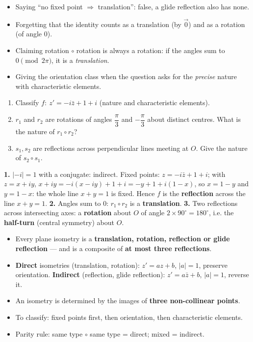 \documentclass[11pt]{article}
\begin{document}
\begin{attention}
\begin{itemize}
\item Saying ``no fixed point $\Rightarrow$ translation'': false, a glide reflection also has none.
\item Forgetting that the identity counts as a translation (by $\vec 0$) and as a rotation (of angle $0$).
\item Claiming rotation $\circ$ rotation is always a rotation: if the angles sum to $0\pmod{2\pi}$, it is a \emph{translation}.
\item Giving the orientation class when the question asks for the \emph{precise} nature with characteristic elements.
\end{itemize}
\end{attention}

\begin{exercice}[Practice]
\begin{enumerate}
\item Classify $f:\ z' = -i\bar z + 1 + i$ (nature and characteristic elements).
\item $r_1$ and $r_2$ are rotations of angles $\dfrac{\pi}{3}$ and $-\dfrac{\pi}{3}$ about distinct centres. What is the nature of $r_1\circ r_2$?
\item $s_1,s_2$ are reflections across perpendicular lines meeting at $O$. Give the nature of $s_2\circ s_1$.
\end{enumerate}
\end{exercice}

\begin{corrige}[Exercise 1]
\textbf{1.} $|{-i}|=1$ with a conjugate: indirect. Fixed points: $z=-i\bar z+1+i$; with $z=x+iy$, $x+iy = -i(x-iy)+1+i = -y+1+i(1-x)$, so $x=1-y$ and $y=1-x$: the whole line $x+y=1$ is fixed. Hence $f$ is the \textbf{reflection} across the line $x+y=1$.
\textbf{2.} Angles sum to $0$: $r_1\circ r_2$ is a \textbf{translation}.
\textbf{3.} Two reflections across intersecting axes: a \textbf{rotation} about $O$ of angle $2\times 90^\circ = 180^\circ$, i.e. the \textbf{half-turn} (central symmetry) about $O$.
\end{corrige}

\begin{aretenir}
\begin{itemize}
\item Every plane isometry is a \textbf{translation, rotation, reflection or glide reflection} — and is a composite of \textbf{at most three reflections}.
\item \textbf{Direct} isometries (translation, rotation): $z'=az+b$, $|a|=1$, preserve orientation. \textbf{Indirect} (reflection, glide reflection): $z'=a\bar z+b$, $|a|=1$, reverse it.
\item An isometry is determined by the images of \textbf{three non-collinear points}.
\item To classify: fixed points first, then orientation, then characteristic elements.
\item Parity rule: same type $\circ$ same type = direct; mixed = indirect.
\end{itemize}
\end{aretenir}
\end{document}
